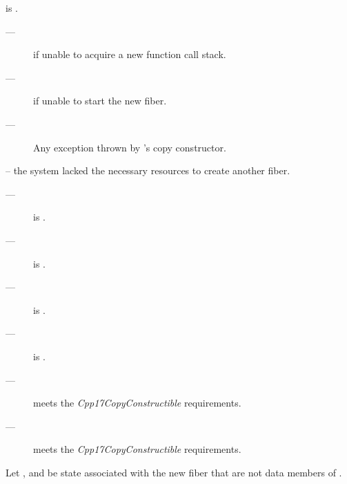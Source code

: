 \postcond
\emptyfn is \false.

\except
\begin{description}
    \item[---]  if unable to acquire a new function call stack.
    \item[---]  if unable to start the new fiber.
    \item[---] Any exception thrown by 's copy constructor.
\end{description}

\errors
{} -- the system lacked the necessary resources to create another fiber.


\mandates
\begin{description}
    \item[---]  is \true.
    \item[---]  is \true.
    \item[---]  is \true.
    \item[---]  is \true.
\end{description}

\precond
\begin{description}
    \item[---]  meets the \emph{Cpp17CopyConstructible} requirements.
    \item[---]  meets the \emph{Cpp17CopyConstructible} requirements.
\end{description}

\para Let , 
and  be state associated with the new fiber
that are not data members of \fiber. 

